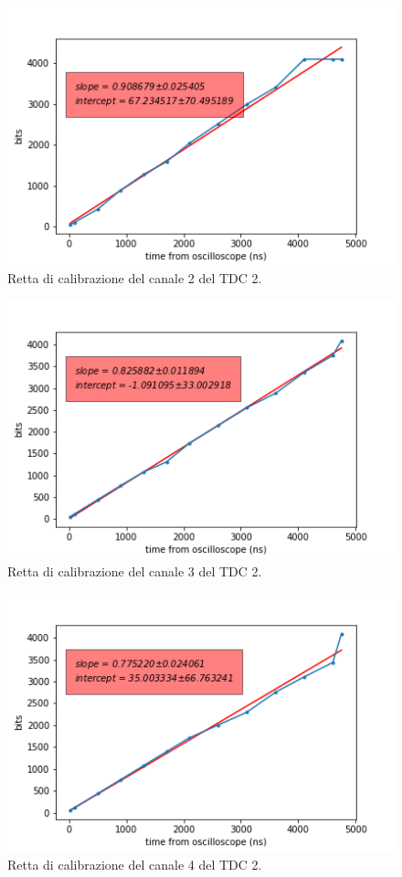 \begin{figure}[H]
  \centering
  \includegraphics[width=.8\textwidth]{plots/tdc22.png}
  \caption{Retta di calibrazione del canale 2 del TDC 2.}
  \label{fig:tdc22}
\end{figure}

\begin{figure}[H]
  \centering
  \includegraphics[width=.8\textwidth]{plots/tdc23.png}
  \caption{Retta di calibrazione del canale 3 del TDC 2.}
  \label{fig:tdc23}
\end{figure}

\begin{figure}[H]
  \centering
  \includegraphics[width=.8\textwidth]{plots/tdc24.png}
  \caption{Retta di calibrazione del canale 4 del TDC 2.}
  \label{fig:tdc24}
\end{figure}

